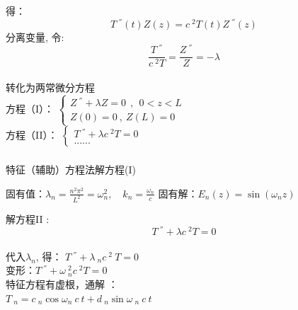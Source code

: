 \begin{frame}
      \frametitle{} 
    得：
	\begin{equation*}
		 T~^{''}(t)Z(z) =c~^2 T(t)Z~^{''}(z) 
	\end{equation*}
	分离变量, 令: {\hspace*{2em}}
      $$ \dfrac{T~^{''}}{c~^2 T}=\dfrac{Z~^{''} }{Z} =-\lambda $$ \\ \vspace{0.3cm}
    转化为两常微分方程 \\ \vspace{0.3cm}
    方程（I）：
      $\displaystyle  \begin{cases}
          Z~^{''} +\lambda Z=0  ~~,~~ 0<z<L\\
          Z(0)=0 ~,~Z(L)=0
      \end{cases}$ \\	
    方程（II）：
      $\displaystyle  \begin{cases}
          T~^{''} +\lambda {c~^2 T}=0 \\
          ......
      \end{cases}$ \\	  
\end{frame}

\begin{frame}
      \frametitle{}
    特征（辅助）方程法解方程(I)  
    \begin{enumerate}
    \IItem 固有值：$\displaystyle  \lambda_n=\frac{n^2\pi^2}{L^2}= \omega^2 _n, \quad k_n=\frac{\omega_n}{c} $ 
    \IItem 固有解：$\displaystyle  E_n(z)=\sin (\omega_n z) $
    \end{enumerate}
    解方程II : 	\[ T~^{''} +\lambda {c~^2 T}=0 \] \\ 
	代入$\lambda_n$, 得：
	$\displaystyle  T~^{''} +\lambda~_n c~^2 ~T=0 $ \\
	变形：$\displaystyle  T~^{''} +\omega ~_n ^2 {c~^2 T}=0 $ \\ 
	特征方程有虚根，通解 ：\\
	\hspace{3cm}	$\displaystyle 	T~_n=c~_n\cos \omega_n~c~t+ d~_n\sin \omega ~_n~c~t $  \\ \vspace{1em}
\end{frame}

